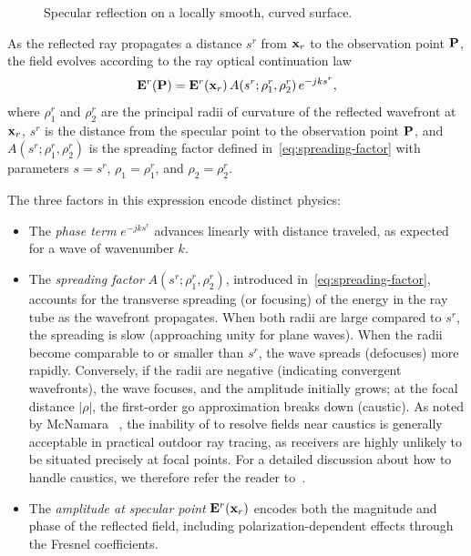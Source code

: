 \begin{figure}
  \centering
  \caption{Specular reflection on a locally smooth, curved surface.}
\end{figure}

As the reflected ray propagates a distance $s^r$ from $\mathbf{x}_r$ to the observation point $\mathbf{P}$, the field evolves according to the ray optical continuation law
\begin{equation}
  \mathbf{E}^r(\mathbf{P}) = \mathbf{E}^r(\mathbf{x}_r) \, A(s^r;\rho_1^r,\rho_2^r) \, e^{-j k s^r},\label{eq:reflected-go-continuation}
\end{equation}
where $\rho_1^r$ and $\rho_2^r$ are the principal radii of curvature of the reflected wavefront at $\mathbf{x}_r$, $s^r$ is the distance from the specular point to the observation point $\mathbf{P}$, and $A(s^r;\rho_1^r,\rho_2^r)$ is the spreading factor defined in~\eqref{eq:spreading-factor} with parameters $s=s^r$, $\rho_1 = \rho_1^r$, and $\rho_2 = \rho_2^r$.

The three factors in this expression encode distinct physics:
\begin{itemize}
  \item The \emph{phase term} $e^{-j k s^r}$ advances linearly with distance traveled, as expected for a wave of \gls{wavenumber} $k$.
  \item The \emph{spreading factor} $A(s^r;\rho_1^r,\rho_2^r)$, introduced in~\eqref{eq:spreading-factor}, accounts for the transverse spreading (or focusing) of the energy in the ray tube as the wavefront propagates. When both radii are large compared to $s^r$, the spreading is slow (approaching unity for plane waves). When the radii become comparable to or smaller than $s^r$, the wave spreads (defocuses) more rapidly. Conversely, if the radii are negative (indicating convergent wavefronts), the wave focuses, and the amplitude initially grows; at the focal distance $|\rho|$, the first-order \gls{go} approximation breaks down (caustic). As noted by McNamara \etal~, the inability of  to resolve fields near caustics is generally acceptable in practical outdoor ray tracing, as receivers are highly unlikely to be situated precisely at focal points. For a detailed discussion about how to handle caustics, we therefore refer the reader to~.
  \item The \emph{amplitude at specular point} $\mathbf{E}^r(\mathbf{x}_r)$ encodes both the magnitude and phase of the reflected field, including polarization-dependent effects through the Fresnel coefficients.
\end{itemize}


